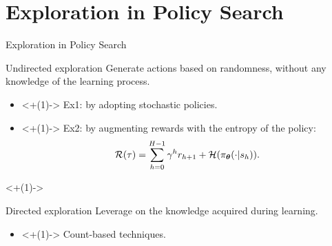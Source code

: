 \section{Exploration in Policy Search}


\begin{frame}{Exploration in Policy Search}
	
	\begin{block}{Undirected exploration}
	Generate actions based on randomness, without any knowledge of the learning process.

	\begin{itemize}[noitemsep,topsep=0pt]
		\item<+(1)-> Ex1: by adopting stochastic policies.
		\item<+(1)-> Ex2: by augmenting rewards with the entropy of the policy: 
		\begin{equation*}
		\mathcal{R}(\tau) = \sum_{h=0}^{H-1}\gamma^hr_{h+1} + \mathcal{H}(\pi_{\boldsymbol{\theta}}(\cdot|s_h)).
		\end{equation*}
	\end{itemize}
	\end{block}
	
	\onslide<+(1)->{
	\begin{block}{Directed exploration}
	Leverage on the knowledge acquired during learning.
		\begin{itemize}
		\item<+(1)-> Count-based techniques.
		\end{itemize}
	\end{block}
	}
	
\end{frame}

%	
%	

